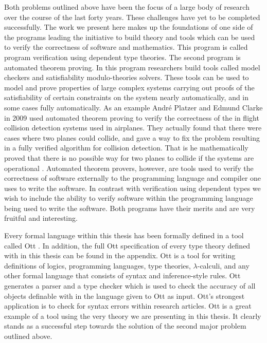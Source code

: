 \documentclass[phd,appendix,dedicationpage,ackpage,epigraphpage,figures]{uithesis}
\begin{document}
Both problems outlined above have been the focus of a large body of
research over the course of the last forty years.  These challenges
have yet to be completed successfully.  The work we present here makes
up the foundations of one side of the programs leading the initiative
to build theory and tools which can be used to verify the correctness
of software and mathematics.  This program is called program
verification using dependent type theories.  The second program is
automated theorem proving.  In this program researchers build tools
called model checkers and satisfiability modulo-theories solvers.
These tools can be used to model and prove properties of large complex
systems carrying out proofs of the satisfiability of certain
constraints on the system nearly automatically, and in some cases
fully automatically.  As an example Andr\'{e} Platzer and Edmund
Clarke in 2009 used automated theorem proving to verify the
correctness of the in flight collision detection systems used in
airplanes.  They actually found that there were cases where two planes
could collide, and gave a way to fix the problem resulting in a fully
verified algorithm for collision detection.  That is he mathematically
proved that there is no possible way for two planes to collide if the
systems are operational \cite{DBLP:conf/fm/PlatzerC09}.  Automated
theorem provers, however, are tools used to verify the correctness of
software externally to the programming language and compiler one uses
to write the software.  In contrast with verification using dependent
types we wish to include the ability to verify software within the
programming language being used to write the software. Both programs
have their merits and are very fruitful and interesting.

Every formal language within this thesis has been formally defined in
a tool called Ott \cite{Sewell:2010}.  In addition, the full Ott
specification of every type theory defined with in this thesis can be
found in the appendix.  Ott is a tool for writing definitions of
logics, programming languages, type theories, $\lambda$-calculi, and
any other formal language that consists of syntax and inference-style
rules.  Ott generates a parser and a type checker which is used to
check the accuracy of all objects definable with in the language given
to Ott as input.  Ott's strongest application is to check for syntax
errors within research articles.  Ott is a great example of a tool
using the very theory we are presenting in this thesis.  It clearly
stands as a successful step towards the solution of the second major
problem outlined above.
\end{document}
